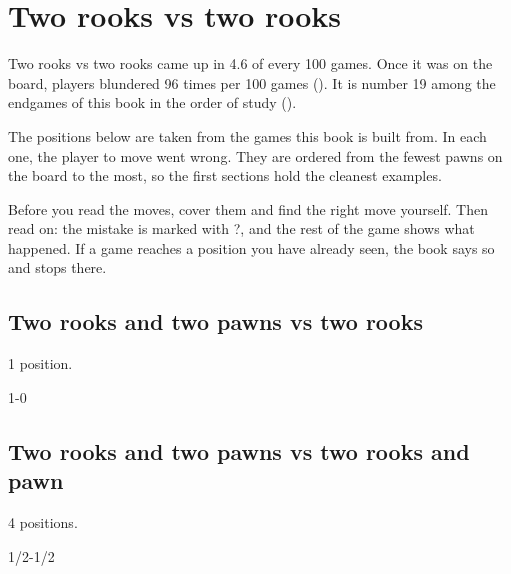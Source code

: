 \chapter{Two rooks vs two rooks}\label{ch:two-rooks-vs-two-rooks}
Two rooks vs two rooks came up in 4.6 of every 100 games. Once it was on the board, players blundered 96 times per 100 games (). It is number 19 among the endgames of this book in the order of study ().

The positions below are taken from the games this book is built from. In each one, the player to move went wrong. They are ordered from the fewest pawns on the board to the most, so the first sections hold the cleanest examples.

Before you read the moves, cover them and find the right move yourself. Then read on: the mistake is marked with ?, and the rest of the game shows what happened. If a game reaches a position you have already seen, the book says so and stops there.


\section{Two rooks and two pawns vs two rooks}
1 position.


1-0\par
\section{Two rooks and two pawns vs two rooks and pawn}
4 positions.


1/2-1/2\par
{}

